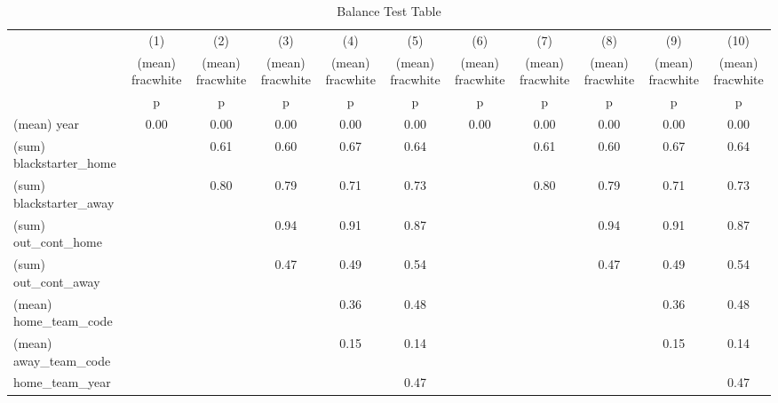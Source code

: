 \begin{table}[htbp]\centering
\def\sym#1{\ifmmode^{#1}\else\(^{#1}\)\fi}
\caption{Balance Test Table \label{tab1}}
\begin{tabular}{l*{10}{c}}
\hline\hline
                    &\multicolumn{1}{c}{(1)}&\multicolumn{1}{c}{(2)}&\multicolumn{1}{c}{(3)}&\multicolumn{1}{c}{(4)}&\multicolumn{1}{c}{(5)}&\multicolumn{1}{c}{(6)}&\multicolumn{1}{c}{(7)}&\multicolumn{1}{c}{(8)}&\multicolumn{1}{c}{(9)}&\multicolumn{1}{c}{(10)}\\
                    &\multicolumn{1}{c}{(mean) fracwhite}&\multicolumn{1}{c}{(mean) fracwhite}&\multicolumn{1}{c}{(mean) fracwhite}&\multicolumn{1}{c}{(mean) fracwhite}&\multicolumn{1}{c}{(mean) fracwhite}&\multicolumn{1}{c}{(mean) fracwhite}&\multicolumn{1}{c}{(mean) fracwhite}&\multicolumn{1}{c}{(mean) fracwhite}&\multicolumn{1}{c}{(mean) fracwhite}&\multicolumn{1}{c}{(mean) fracwhite}\\
                    &           p&           p&           p&           p&           p&           p&           p&           p&           p&           p\\
\hline
(mean) year         &        0.00&        0.00&        0.00&        0.00&        0.00&        0.00&        0.00&        0.00&        0.00&        0.00\\
(sum) blackstarter\_home&            &        0.61&        0.60&        0.67&        0.64&            &        0.61&        0.60&        0.67&        0.64\\
(sum) blackstarter\_away&            &        0.80&        0.79&        0.71&        0.73&            &        0.80&        0.79&        0.71&        0.73\\
(sum) out\_cont\_home &            &            &        0.94&        0.91&        0.87&            &            &        0.94&        0.91&        0.87\\
(sum) out\_cont\_away &            &            &        0.47&        0.49&        0.54&            &            &        0.47&        0.49&        0.54\\
(mean) home\_team\_code&            &            &            &        0.36&        0.48&            &            &            &        0.36&        0.48\\
(mean) away\_team\_code&            &            &            &        0.15&        0.14&            &            &            &        0.15&        0.14\\
home\_team\_year      &            &            &            &            &        0.47&            &            &            &            &        0.47\\

\end{tabular}
\end{table}
